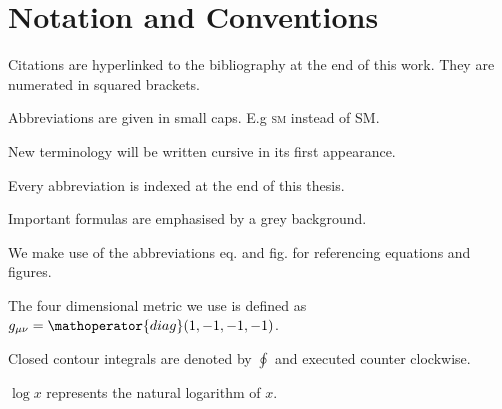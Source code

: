 \documentclass[../../index.tex]{subfiles}
\begin{document}
\chapter*{Notation and Conventions}

Citations are hyperlinked to the bibliography at the end of this work. They are
numerated in squared brackets. \vspace{0.3cm}

Abbreviations are given in small caps. E.g \textsc{sm} instead of SM.
\vspace{0.3cm}

New terminology will be written cursive in its first appearance.

Every abbreviation is indexed at the end of this thesis. \vspace{0.3cm}

Important formulas are emphasised by a grey background. \vspace{0.3cm}

We make use of the abbreviations eq. and fig. for referencing equations and
figures. \vspace{0.3cm}

The four dimensional metric we use is defined as \(g_{\mu\nu} =
\mathoperator{diag}(1, -1, -1, -1)\). \vspace{0.3cm}

Closed contour integrals are denoted by \(\oint\) and executed
counter clockwise. \vspace{0.3cm}

\(\log x\) represents the natural logarithm of \(x\).
\end{document}
